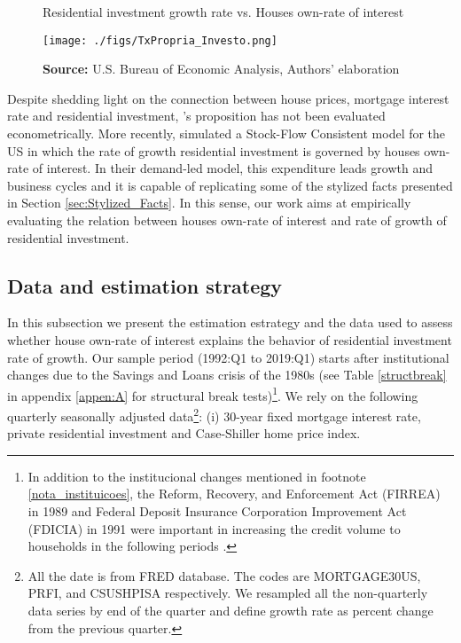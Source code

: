 \documentclass[12pt, a4paper]{article}
\begin{document}
\begin{figure}[htb]
	\centering
	\caption{Residential investment growth rate vs. Houses own-rate of interest}
	\label{propria_investo}
	\texttt{[image: ./figs/TxPropria\_Investo.png]}
	\caption*{\textbf{Source:} U.S. Bureau of Economic Analysis, Authors' elaboration}
\end{figure}

Despite shedding light on the connection between house prices, mortgage interest rate and residential investment, \citeauthor*{teixeira_crescimento_2015}'s \citeyear{teixeira_crescimento_2015} proposition has not been evaluated econometrically.
More recently, \textcite{petrini_2021_TD} simulated a Stock-Flow Consistent model for the US in which the rate of growth residential investment is governed by houses own-rate of interest.
In their demand-led model, this expenditure leads growth and business cycles and it is capable of replicating some of the stylized facts presented in Section \ref{sec:Stylized_Facts}.
In this sense, our work aims at empirically evaluating the relation between houses own-rate of interest and rate of growth of residential investment.


\subsection{Data and estimation strategy}
\label{sec:orgc853eeb}
\label{sec:estimation}

In this subsection we present the estimation estrategy and the data used to assess whether house own-rate of interest explains the behavior of residential investment rate of growth.
Our sample period (1992:Q1 to 2019:Q1) starts after institutional changes due to the Savings and Loans crisis of the 1980s (see Table \ref{structbreak} in appendix \ref{appen:A} for structural break tests)\footnote{In addition to the institucional changes mentioned in footnote  \ref{nota_instituicoes}, the Reform, Recovery, and Enforcement Act (FIRREA) in 1989 and Federal Deposit Insurance Corporation Improvement Act (FDICIA) in 1991 were important in increasing the credit volume to households in the following periods \cite{wall_too_2010}.}.
We rely on the following  quarterly seasonally adjusted data\footnote{All the date is from FRED database. The codes are MORTGAGE30US, PRFI, and CSUSHPISA respectively. We resampled all the non-quarterly data series by end of the quarter and define growth rate as percent change from the previous quarter.}: (i) 30-year fixed mortgage interest rate, private residential investment and Case-Shiller home price index.
\end{document}
